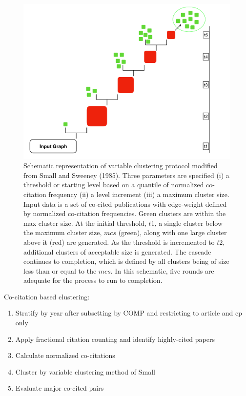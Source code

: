 \begin{figure}[ht]
\centering
  \includegraphics[scale=0.3]{vlc.pdf}
\caption{Schematic representation of variable clustering protocol modified from Small and Sweeney (1985). Three parameters are specified (i) a threshold or starting level based on a quantile of normalized co-citation frequency (ii) a level increment (iii) a maximum cluster size. Input data is a set of co-cited publications with edge-weight defined by normalized co-citation frequencies. Green clusters are within the max cluster size. At the initial threshold, $t1$, a single cluster below the maximum cluster size, $mcs$ (green), along with one large cluster above it (red) are generated. As the threshold is incremented to $t2$, additional clusters of acceptable size is generated. The cascade continues to completion, which is defined by all clusters being of size less than or equal to the $mcs$. In this schematic, five rounds are adequate for the process to run to completion.}
\label{vlc_process}       %
\end{figure}

\noindent
Co-citation based clustering:
\begin{enumerate}
\item Stratify by year after subsetting by COMP and restricting to article and cp only
\item Apply fractional citation counting and identify highly-cited papers
\item Calculate normalized co-citations
\item Cluster by variable clustering method of Small
\item Evaluate major co-cited pairs
\end{enumerate}


